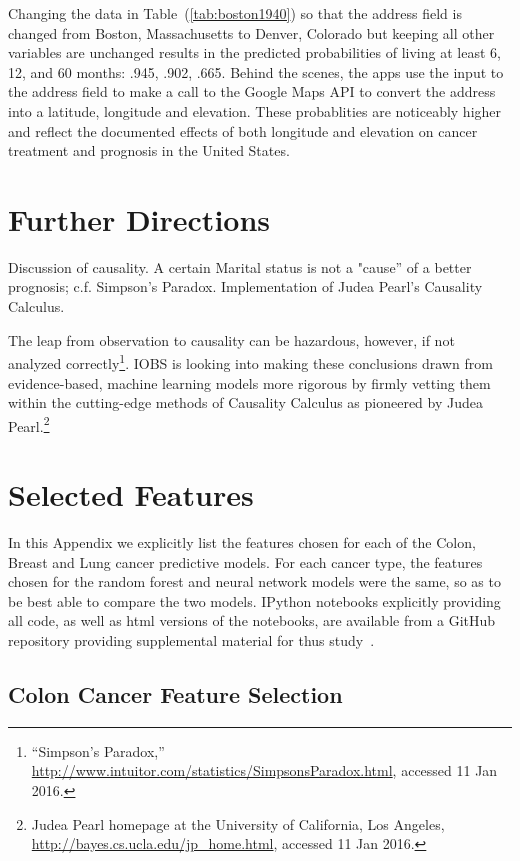 \documentclass[a4paper,11pt]{article}
\begin{document}
Changing the data in Table~(\ref{tab:boston1940}) so that the address field is changed from Boston, Massachusetts to Denver, Colorado but keeping all other variables are unchanged results in the predicted probabilities of living at least 6, 12, and 60 months: .945, .902, .665. 
Behind the scenes, the apps use the input to the address field to make a call to the Google Maps API to convert the address into a latitude, longitude and elevation.
These probablities are noticeably higher and reflect the documented effects of both longitude and elevation on cancer treatment and prognosis in the United States.


\section{Further Directions}

Discussion of causality. A certain Marital status is not a "cause'' of a better prognosis; c.f. Simpson's Paradox. Implementation of Judea Pearl's Causality Calculus.

The leap from observation to causality can be hazardous, however, if not analyzed correctly\footnote{``Simpson's Paradox,'' \url{http://www.intuitor.com/statistics/SimpsonsParadox.html}, accessed 11 Jan 2016.}.
 IOBS is looking into making these conclusions drawn from evidence-based, machine learning models more rigorous by firmly vetting them within the cutting-edge methods of Causality Calculus as pioneered by Judea Pearl.\footnote{Judea Pearl homepage at the University of California, Los Angeles, \url{http://bayes.cs.ucla.edu/jp_home.html}, accessed 11 Jan 2016.}

\appendix
\section{Selected Features}
\label{sec:features}
In this Appendix we explicitly list the features chosen for each of the Colon, Breast and Lung cancer predictive models. For each cancer type, the features chosen for the random forest and neural network models were the same, so as to be best able to compare the two models.
IPython notebooks explicitly providing all code, as well as html versions of the notebooks, are available from a GitHub repository providing supplemental material for thus study~\cite{supp}.



\subsection{Colon Cancer Feature Selection}
\label{subsec:colonfeatures}
\end{document}
